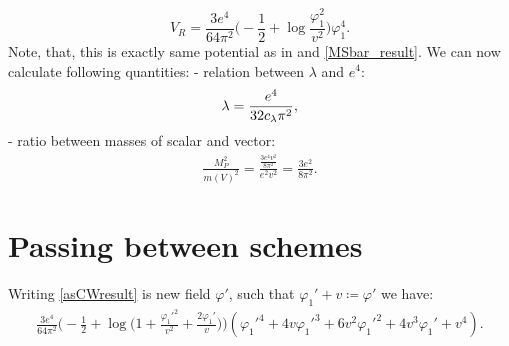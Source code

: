 \begin{equation}
V_R=\frac{3e^4}{64\pi^2}\Big(-\frac{1}{2}+\log\frac{\varphi_1^2}{v^2}\Big)\varphi_1^4.
\end{equation}
Note, that, this is exactly same potential as in \cite{Coleman1973} and \ref{MSbar_result}. 
We can now calculate following quantities:
\hspace*{0.5cm}- relation between $\lambda$ and $e^4$:
\begin{align}
\lambda = \frac{e^4}{32c_\lambda\pi^2},
\end{align}
\hspace*{0.5cm}- ratio between masses of scalar and vector:
\begin{align}
\frac{M_P^2}{m(V)^2} = \frac{\frac{3e^4v^2}{8\pi^2}}{e^2v^2} = \frac{3e^2}{8\pi^2}.
\end{align}

\section{Passing between schemes}
Writing \ref{asCWresult} is new field $\varphi'$, such that $\varphi_1' + v \coloneqq \varphi'$
we have:
\begin{align}
\frac{3e^4}{64\pi^2}\Big(-\frac{1}{2}+\log\big(1+\frac{\varphi_1'^2}{v^2}+\frac{2\varphi_1'}{v}
\big)\Big)
(\varphi_1'^4 + 4v\varphi_1'^3+6v^2\varphi_1'^2+4v^3\varphi_1'+v^4).
\end{align}

